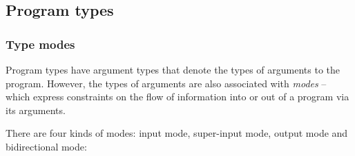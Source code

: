 \subsection{Program types}

\subsubsection{Type modes}

Program types have argument types that denote the types of arguments to the program. However, the types of arguments are also associated with \emph{modes} -- which express constraints on the flow of information into or out of a program via its arguments.

There are four kinds of modes: input mode, super-input mode, output mode and bidirectional mode:
